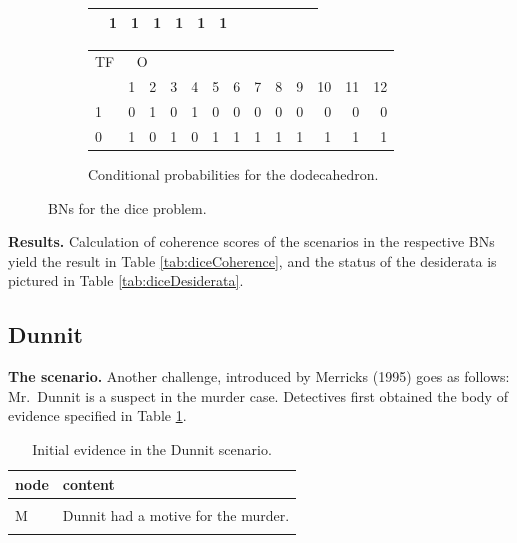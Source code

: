 \documentclass[
  10pt,
]{scrartcl}
\begin{document}
\begin{figure}[H]
{\begin{subfigure}[!ht]{0.7\textwidth}
\begin{tabular}{lrrrrrrrrrrrr}
 & 1 & 1 & 1 & 1 & 1 & 1\\
\bottomrule
\end{tabular}


\begin{tabular}{lrrrrrrrrrrrr}
\toprule
\multicolumn{1}{c}{TF} & \multicolumn{2}{c}{O} \\
  & 1 & 2 & 3 & 4 & 5 & 6 & 7 & 8 & 9 & 10 & 11 & 12\\
\midrule
1 & 0 & 1 & 0 & 1 & 0 & 0 & 0 & 0 & 0 & 0 & 0 & 0\\
0 & 1 & 0 & 1 & 0 & 1 & 1 & 1 & 1 & 1 & 1 & 1 & 1\\
\bottomrule
\end{tabular}
\caption{\large Conditional probabilities for the dodecahedron.}
\end{subfigure}} 
\caption{BNs for the \textsf{dice} problem.}
\label{fig:diceBN}
\end{figure}

\textbf{Results.} Calculation of coherence scores of the scenarios in the respective BNs yield the result in Table \ref{tab:diceCoherence}, and the status of the desiderata is pictured in Table \ref{tab:diceDesiderata}.


\hypertarget{dunnit}{%
\subsection{Dunnit}\label{dunnit}}

\textbf{The scenario.} Another challenge, introduced by Merricks (1995) goes as follows: Mr.~Dunnit is a suspect in the murder case. Detectives first obtained the body of evidence specified in Table \ref{tab:dunnitPropositions1}.

\begin{table}[H]

\caption{\label{tab:dunnitPropositions1}Initial evidence in the Dunnit scenario.}
\centering
\begin{tabular}[t]{l>{\raggedright\arraybackslash}p{25em}}
\toprule
node & content\\
\midrule
\cellcolor{gray!6}{I} & \cellcolor{gray!6}{Witnesses claim to have seen Dunnit do it (incriminating testimony).}\\
M & Dunnit had a motive for the murder.\\
\cellcolor{gray!6}{W} & \cellcolor{gray!6}{A credible witness claims to have seen Dunnit two hundred miles from the scene of the crime at the time of the murder.}\\
\bottomrule
\end{tabular}
\end{table}
\end{document}
